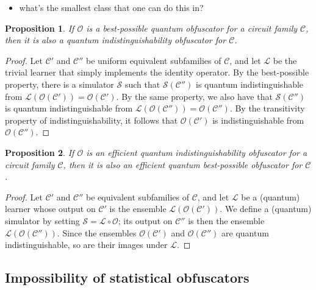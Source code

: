\documentclass[11pt]{article}
\numberwithin{equation}{section}
\newtheorem{proposition}{Proposition}
\begin{document}
\begin{itemize}
\item what's the smallest class that one can do this in?
\end{itemize}

\begin{proposition} If $\mathcal O$ is a best-possible quantum obfuscator for a circuit family $\mathcal C$, then it is also a quantum indistinguishability obfuscator for $\mathcal C$.
\end{proposition}
\begin{proof}
Let $\mathcal C'$ and $\mathcal C''$ be uniform equivalent subfamilies of $\mathcal C$, and let $\mathcal L$ be the trivial learner that simply implements the identity operator. By the best-possible property, there is a simulator $\mathcal S$ such that $\mathcal S(\mathcal C'')$ is quantum indistinguishable from $\mathcal L ( \mathcal O( \mathcal C')) = \mathcal O ( \mathcal C')$. By the same property, we also have that $\mathcal S(\mathcal C'')$ is quantum indistinguishable from $\mathcal L(\mathcal O (\mathcal C'')) = \mathcal O( \mathcal C'')$. By the transitivity property of indistinguishability, it follows that $\mathcal O(\mathcal C')$ is indistinguishable from $\mathcal O(\mathcal C'')$.
\end{proof}

\begin{proposition} If $\mathcal O$ is an efficient quantum indistinguishability obfuscator for a circuit family $\mathcal C$, then it is also an efficient quantum best-possible obfuscator for $\mathcal C$.
\end{proposition}
\begin{proof}
Let $\mathcal C'$ and $\mathcal C''$ be equivalent subfamilies of $\mathcal C$, and let $\mathcal L$ be a (quantum) learner whose output on $\mathcal C'$ is the ensemble $\mathcal L(\mathcal O (\mathcal C'))$. We define a (quantum) simulator by setting $\mathcal S = \mathcal L \circ \mathcal O$; its output on $\mathcal C''$ is then the ensemble $\mathcal L(\mathcal O(\mathcal C''))$. Since the ensembles $\mathcal O(\mathcal C')$ and $\mathcal O(\mathcal C'')$ are quantum indistinguishable, so are their images under $\mathcal L$.
\end{proof}

\subsection{Impossibility of statistical obfuscators}
\end{document}
